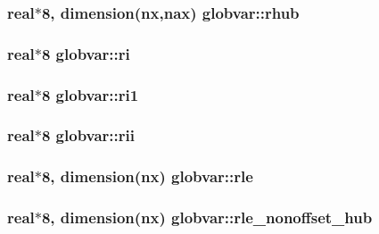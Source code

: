 \subsubsection[{rhub}]{\setlength{\rightskip}{0pt plus 5cm}real$\ast$8, dimension({\bf nx},{\bf nax}) globvar\+::rhub}\label{namespaceglobvar_a0b0a00223529e708d5a7f66cc140e50d}
\hypertarget{namespaceglobvar_a12aec4b3d6dfcab1523c9d90f90da9b9}{}
\subsubsection[{ri}]{\setlength{\rightskip}{0pt plus 5cm}real$\ast$8 globvar\+::ri}\label{namespaceglobvar_a12aec4b3d6dfcab1523c9d90f90da9b9}
\hypertarget{namespaceglobvar_af44048ca90b116b55e4b210a748fb9fd}{}
\subsubsection[{ri1}]{\setlength{\rightskip}{0pt plus 5cm}real$\ast$8 globvar\+::ri1}\label{namespaceglobvar_af44048ca90b116b55e4b210a748fb9fd}
\hypertarget{namespaceglobvar_a69c8e6a82732e6c3845873852cc473cb}{}
\subsubsection[{rii}]{\setlength{\rightskip}{0pt plus 5cm}real$\ast$8 globvar\+::rii}\label{namespaceglobvar_a69c8e6a82732e6c3845873852cc473cb}
\hypertarget{namespaceglobvar_ad03d6f3d23b278acc643ea493cf17fa5}{}
\subsubsection[{rle}]{\setlength{\rightskip}{0pt plus 5cm}real$\ast$8, dimension({\bf nx}) globvar\+::rle}\label{namespaceglobvar_ad03d6f3d23b278acc643ea493cf17fa5}
\hypertarget{namespaceglobvar_aa7b9d1ee9e6007aabeaeeacdaa0f3544}{}
\subsubsection[{rle\+\_\+nonoffset\+\_\+hub}]{\setlength{\rightskip}{0pt plus 5cm}real$\ast$8, dimension({\bf nx}) globvar\+::rle\+\_\+nonoffset\+\_\+hub}\label{namespaceglobvar_aa7b9d1ee9e6007aabeaeeacdaa0f3544}
\hypertarget{namespaceglobvar_a94cb0237ff6d0453b0beb753150747e5}{}

